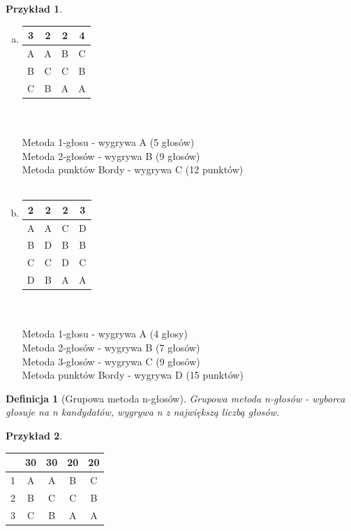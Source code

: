 \documentclass[12pt,a4paper]{article}
\theoremstyle{break}
\newtheorem{definition}{Definicja}[section]
\newtheorem{example}{Przykład}[section]
\begin{document}
	\begin{example} \end{example} \begin{enumerate}[a)]
	
	\item \begin{tabular}{|c|c|c|c|}\hline
		3&2&2&4\\\hline
		A&A&B&C\\\hline
		B&C&C&B\\\hline
		C&B&A&A\\\hline
	\end{tabular}\\\\

	Metoda 1-głosu - wygrywa A (5 głosów)\\
	Metoda 2-głosów - wygrywa B (9 głosów)\\
	Metoda punktów Bordy - wygrywa C (12 punktów)\\\\

	\item \begin{tabular}{|c|c|c|c|}\hline
		2&2&2&3\\\hline
		A&A&C&D\\\hline
		B&D&B&B\\\hline
		C&C&D&C\\\hline
		D&B&A&A\\\hline
	\end{tabular}\\\\

	Metoda 1-głosu - wygrywa A (4 głosy)\\
	Metoda 2-głosów - wygrywa B (7 głosów)\\
	Metoda 3-głosów - wygrywa C (9 głosów)\\
	Metoda punktów Bordy - wygrywa D (15 punktów)
	
	\end{enumerate} 
	
	
	\begin{definition}[Grupowa metoda n-głosów]
		Grupowa metoda n-głosów - wyborca głosuje na n kandydatów, wygrywa n z największą liczbą głosów.
	\end{definition}
	
	\begin{example}
		
	\end{example}
	
	\begin{tabular}{|c|c|c|c|c|}\hline
		&30&30&20&20\\\hline
		1&A&A&B&C\\\hline
		2&B&C&C&B\\\hline
		3&C&B&A&A\\\hline
	\end{tabular}\\\\
\end{document}
